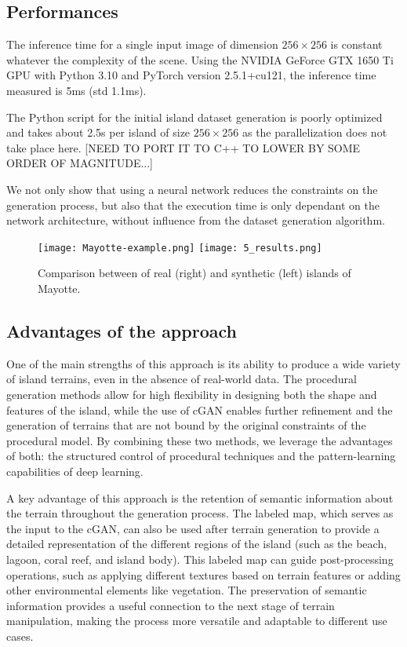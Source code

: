 \subsection{Performances}
The inference time for a single input image of dimension $256 \times 256$ is constant whatever the complexity of the scene. Using the NVIDIA GeForce GTX 1650 Ti GPU with Python 3.10 and PyTorch version 2.5.1+cu121, the inference time measured is 5ms (std 1.1ms). 

The Python script for the initial island dataset generation is poorly optimized and takes about 2.5s per island of size $256 \times 256$ as the parallelization does not take place here.  [NEED TO PORT IT TO C++ TO LOWER BY SOME ORDER OF MAGNITUDE...]

We not only show that using a neural network reduces the constraints on the generation process, but also that the execution time is only dependant on the network architecture, without influence from the dataset generation algorithm. 


\begin{figure}
    \texttt{[image: Mayotte-example.png]}
    \texttt{[image: 5\_results.png]}
    \caption{Comparison between of real (right) and synthetic (left) islands of Mayotte.}
\end{figure}


\subsection{Advantages of the approach}

One of the main strengths of this approach is its ability to produce a wide variety of island terrains, even in the absence of real-world data. The procedural generation methods allow for high flexibility in designing both the shape and features of the island, while the use of cGAN enables further refinement and the generation of terrains that are not bound by the original constraints of the procedural model. By combining these two methods, we leverage the advantages of both: the structured control of procedural techniques and the pattern-learning capabilities of deep learning.

A key advantage of this approach is the retention of semantic information about the terrain throughout the generation process. The labeled map, which serves as the input to the cGAN, can also be used after terrain generation to provide a detailed representation of the different regions of the island (such as the beach, lagoon, coral reef, and island body). This labeled map can guide post-processing operations, such as applying different textures based on terrain features or adding other environmental elements like vegetation. The preservation of semantic information provides a useful connection to the next stage of terrain manipulation, making the process more versatile and adaptable to different use cases.

